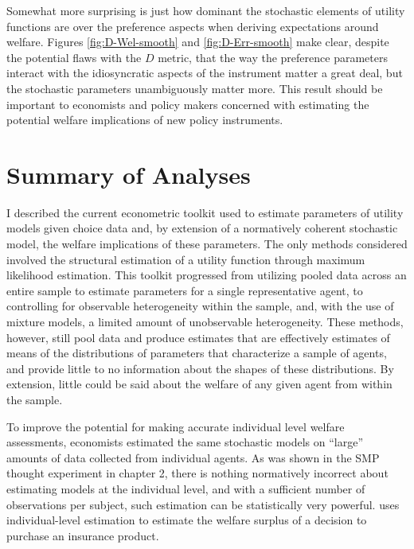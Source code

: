 \documentclass[../main.tex]{subfiles}
\begin{document}
Somewhat more surprising is just how dominant the stochastic elements of utility functions are over the preference aspects when deriving expectations around welfare.
Figures \ref{fig:D-Wel-smooth} and \ref{fig:D-Err-smooth} make clear, despite the potential flaws with the $D$ metric, that the way the preference parameters interact with the idiosyncratic aspects of the instrument matter a great deal, but the stochastic parameters unambiguously matter more.
This result should be important to economists and policy makers concerned with estimating the potential welfare implications of new policy instruments.

\section{Summary of Analyses}

I described the current econometric toolkit used to estimate parameters of utility models given choice data and, by extension of a normatively coherent stochastic model, the welfare implications of these parameters.
The only methods considered involved the structural estimation of a utility function through maximum likelihood estimation.
This toolkit progressed from utilizing pooled data across an entire sample to estimate parameters for a single representative agent, to controlling for observable heterogeneity within the sample, and, with the use of mixture models, a limited amount of unobservable heterogeneity.
These methods, however, still pool data and produce estimates that are effectively estimates of means of the distributions of parameters that characterize a sample of agents, and provide little to no information about the shapes of these distributions.
By extension, little could be said about the welfare of any given agent from within the sample.

To improve the potential for making accurate individual level welfare assessments, economists estimated the same stochastic models on \enquote{large} amounts of data collected from individual agents.
As was shown in the SMP thought experiment in chapter 2, there is nothing normatively incorrect about estimating models at the individual level, and with a sufficient number of observations per subject, such estimation can be statistically very powerful.
\textcite{Harrison2016} uses individual-level estimation to estimate the welfare surplus of a decision to purchase an insurance product.

\end{document}
